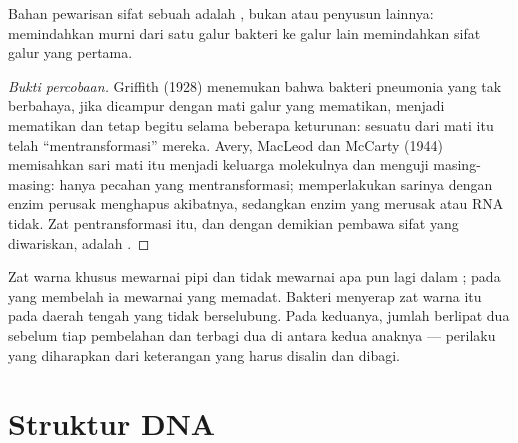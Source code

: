 \begin{proposition}\label{prop:g10:universal-dna:material}
Bahan pewarisan sifat sebuah  adalah , bukan  atau
penyusun lainnya: memindahkan  murni dari satu galur bakteri ke
galur lain memindahkan sifat galur yang pertama.
\end{proposition}
\begin{proof}[Bukti percobaan]
Griffith (1928) menemukan bahwa bakteri pneumonia yang tak berbahaya,
jika dicampur dengan  mati galur yang mematikan, menjadi mematikan
dan tetap begitu selama beberapa keturunan: sesuatu dari  mati itu
telah ``mentransformasi'' mereka. Avery, MacLeod dan McCarty (1944)
memisahkan sari  mati itu menjadi keluarga molekulnya dan menguji
masing-masing: hanya pecahan  yang mentransformasi; memperlakukan
sarinya dengan enzim perusak  menghapus akibatnya, sedangkan enzim
yang merusak  atau RNA tidak. Zat pentransformasi itu, dan
dengan demikian pembawa sifat yang diwariskan, adalah .
\end{proof}

\begin{example}\label{ex:g10:universal-dna:where}
Zat warna khusus  mewarnai  pipi dan tidak mewarnai apa pun
lagi dalam ; pada  yang membelah ia mewarnai 
yang memadat. Bakteri menyerap zat warna itu pada daerah tengah yang
tidak berselubung. Pada keduanya, jumlah  berlipat dua sebelum tiap
pembelahan dan terbagi dua di antara kedua  anaknya --- perilaku
yang diharapkan dari keterangan yang harus disalin dan dibagi.
\end{example}

\section{Struktur DNA}

